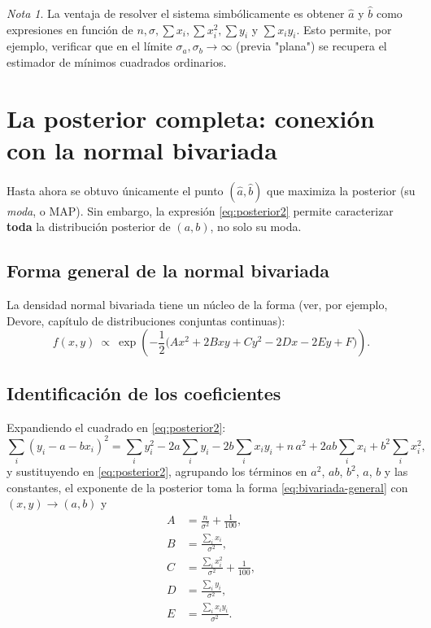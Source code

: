 \documentclass[11pt]{article}
\theoremstyle{remark}
\newtheorem*{nota}{Nota}
\begin{document}
\begin{nota}
La ventaja de resolver el sistema simbólicamente es obtener $\hat a$ y
$\hat b$ como expresiones en función de $n,\sigma,\sum x_i,\sum x_i^2,\sum y_i$
y $\sum x_iy_i$. Esto permite, por ejemplo, verificar que en el límite
$\sigma_a,\sigma_b\to\infty$ (previa "plana") se recupera el estimador de
mínimos cuadrados ordinarios.
\end{nota}

\section{La posterior completa: conexión con la normal bivariada}

Hasta ahora se obtuvo únicamente el punto $(\hat a,\hat b)$ que maximiza la
posterior (su \emph{moda}, o MAP). Sin embargo, la expresión
\eqref{eq:posterior2} permite caracterizar \textbf{toda} la distribución
posterior de $(a,b)$, no solo su moda.

\subsection{Forma general de la normal bivariada}

La densidad normal bivariada tiene un núcleo de la forma (ver, por ejemplo,
Devore, capítulo de distribuciones conjuntas continuas):
\begin{equation}
f(x,y)\ \propto\ \exp\!\left(-\frac12\Big(Ax^2+2Bxy+Cy^2-2Dx-2Ey+F\Big)\right).
\label{eq:bivariada-general}
\end{equation}

\subsection{Identificación de los coeficientes}

Expandiendo el cuadrado en \eqref{eq:posterior2}:
\begin{equation}
\sum_i(y_i-a-bx_i)^2 = \sum_i y_i^2 - 2a\sum_i y_i - 2b\sum_i x_iy_i
+ n\,a^2 + 2ab\sum_i x_i + b^2\sum_i x_i^2,
\label{eq:expansion}
\end{equation}
y sustituyendo en \eqref{eq:posterior2}, agrupando los términos en $a^2$,
$ab$, $b^2$, $a$, $b$ y las constantes, el exponente de la posterior toma la
forma \eqref{eq:bivariada-general} con $(x,y)\to(a,b)$ y
\begin{align}
A &= \frac{n}{\sigma^2}+\frac{1}{100}, \label{eq:coefA}\\
B &= \frac{\sum_i x_i}{\sigma^2}, \label{eq:coefB}\\
C &= \frac{\sum_i x_i^2}{\sigma^2}+\frac{1}{100}, \label{eq:coefC}\\
D &= \frac{\sum_i y_i}{\sigma^2}, \label{eq:coefD}\\
E &= \frac{\sum_i x_iy_i}{\sigma^2}. \label{eq:coefE}
\end{align}
\end{document}
